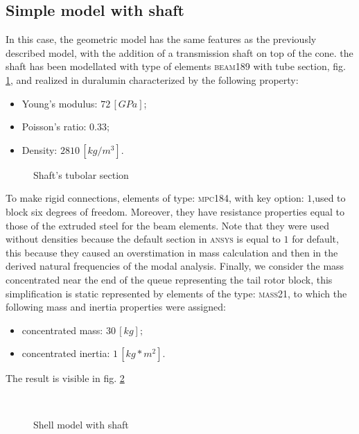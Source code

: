 \subsection{Simple model with shaft}
In this case, the geometric model has the same features as the previously described model, with the addition of a transmission shaft on top of the cone.
the shaft has been modellated with type of elements \textsc{beam189} with tube section, fig. \ref{fig:SectCTube}, and realized in duralumin characterized by the following property:
\begin{itemize}
\item Young's modulus: $72\,[GPa]$;
\item Poisson's ratio: $0.33$;
\item Density: $2810\,[kg/m^3]$.
\end{itemize}
\begin{figure}[htb]
\centering
\resizebox{.25\linewidth}{!}{}
\caption{Shaft's tubolar section}
\label{fig:SectCTube}
\end{figure}
To make rigid connections, elements of type: \textsc{mpc184}, with key option: $1$,used to block six degrees of freedom. Moreover, they have resistance properties equal to those of the extruded steel for the beam elements. 
Note that they were used without densities because the default section in \textsc{ansys} is equal to $1$ for default, this because they caused an overstimation in mass calculation and then in the derived natural frequencies of the modal analysis.
Finally, we consider the mass concentrated near the end of the queue representing the tail rotor block, this simplification is static represented by elements of the type: \textsc{mass21}, to which the following mass and inertia properties were assigned:
\begin{itemize}
\item concentrated mass: $30\,[kg];$
\item concentrated inertia:  $1\,[kg*m^2]$. 
\end{itemize}
The result is visible in fig. \ref{fig:Ansys1MeshShaft}

\begin{figure}[ht]
\centering
{} \quad
{}\\
\caption{Shell model with shaft}
\label{fig:Ansys1MeshShaft}
\end{figure}

